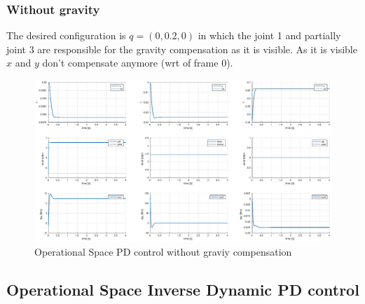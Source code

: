 \documentclass[a4paper,12pt]{article}
\begin{document}
\subsubsection{Without gravity}

The desired configuration is $q = (0, 0.2, 0)$ in which the joint 1 and partially joint 3 are responsible for the gravity compensation as it is visible. As it is visible $x$ and $y$ don't compensate anymore (wrt of frame 0).

\begin{figure}[H]
    \begin{center}
        \hspace*{-4.5cm}
        \includegraphics[scale=0.5]{images/op_without_gravity.eps}
    \end{center}
    \caption{Operational Space PD control without graviy compensation}
    \label{fig:without_gravity_op}
\end{figure}

\newpage
\subsection{Operational Space Inverse Dynamic PD control}
\end{document}
